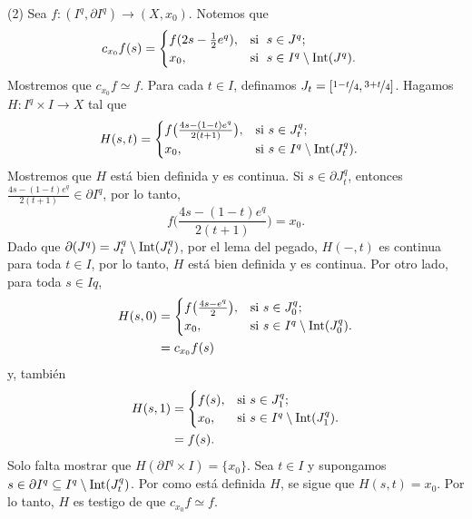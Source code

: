 \begin{dem}
    (2) Sea $f:(I^q,\partial I^q)\to (X,x_0)$. Notemos que 
    \begin{align*}
        c_{x_0}f(s)&=\begin{cases}
         f(2s-\frac{1}{2}e^q), & \text{si \;} s\in J^q;\\
         x_0, & \text{si \;} s\in I^q\setminus\mathrm{Int}(J^q).\\
        \end{cases}
    \end{align*}
    Mostremos que $c_{x_0}f\simeq f$. Para cada $t\in I$, definamos $J_t=[\nicefrac{1-t}{4},\nicefrac{3+t}{4}]$. Hagamos $H: I^q \times I \to X$ tal que
    \begin{align*}
        H(s, t) &= 
        \begin{cases}
            f\big(\frac{4s-(1-t)e^q}{2(t+1)}\big), & \text{si } s \in J_t^q; \\
            x_0, & \text{si } s \in I^q \setminus \mathrm{Int}(J_t^q).
        \end{cases}
    \end{align*}
    Mostremos que $H$ está bien definida y es continua. Si $s\in \partial J_t^q$, entonces $\frac{4s-(1-t)e^q}{2(t+1)}\in \partial I^q$, por lo tanto,
    \begin{equation*}
        f\big(\textstyle\frac{4s-(1-t)e^q}{2(t+1)}\big)=x_0.
    \end{equation*}
    Dado que $\partial(J^q)=J_t^q\setminus\mathrm{Int}(J_t^q)$, por el lema del pegado, $H(-,t)$ es continua para toda $t\in I$, por lo tanto, $H$ está bien definida y es continua. Por otro lado, para toda $s\in Iq$,
    \begin{align*}
        H(s,0)&=\begin{cases}
            f\big(\frac{4s-e^q}{2}\big), & \text{si } s \in J_0^q; \\
            x_0, & \text{si } s \in I^q \setminus \mathrm{Int}(J_0^q).
        \end{cases}\\
        &=c_{x_0}f(s)
    \end{align*}
    y, también
    \begin{align*}
        H(s,1)&=\begin{cases}
            f(s), & \text{si } s \in J_1^q; \\
            x_0, & \text{si } s \in I^q \setminus \mathrm{Int}(J_1^q).
        \end{cases}\\
        &=f(s).
    \end{align*}
    Solo falta mostrar que $H(\partial I^q\times I)=\{x_0\}$. Sea $t\in I$ y supongamos $s\in\partial I^q\subseteq I^q\setminus\mathrm{Int}(J^q_t)$. Por como está definida $H$, se sigue que $H(s,t)=x_0$. Por lo tanto, $H$ es testigo de que $c_{x_0}f\simeq f$. 


\end{dem}
